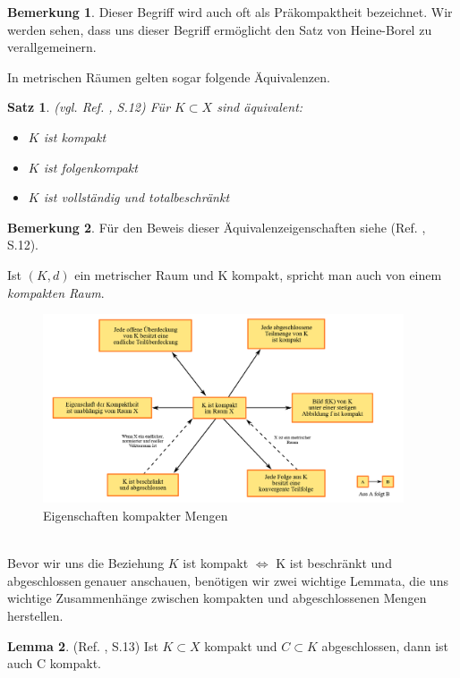 \documentclass[10pt,a4paper]{article}
\theoremstyle{plain}
\newtheorem{satz}{Satz}[section]
\newenvironment{sa}{\begin{shaded}\begin{satz}}{\end{satz}\end{shaded}}
\theoremstyle{definition}
\newtheorem{lemma}[satz]{Lemma}
\newenvironment{lem}{\begin{shaded}\begin{lemma}}{\end{lemma}\end{shaded}}
\theoremstyle{nonumberplain}
\newtheorem{bemerkung}{Bemerkung}
\newenvironment{bem}{\begin{bemerkung}}{\end{bemerkung}}
\begin{document}
\begin{bem}
Dieser Begriff wird auch oft als Präkompaktheit bezeichnet. Wir werden sehen, dass uns dieser Begriff ermöglicht den Satz von Heine-Borel zu verallgemeinern.
\end{bem}
In metrischen Räumen gelten sogar folgende Äquivalenzen.
\begin{sa}
\label{komp_eq}
(vgl. Ref. \cite{Clason}, S.12) Für $K \subset X$ sind äquivalent:
\begin{itemize}
\item[(i)] $K$ ist kompakt
\item[(ii)] $K$ ist folgenkompakt
\item[(iii)] $K$ ist vollständig und totalbeschränkt
\end{itemize}
\end{sa}
\begin{bem}
Für den Beweis dieser Äquivalenzeigenschaften siehe (Ref. \cite{Clason}, S.12).
\end{bem}
\noindent Ist $(K,d)$ ein metrischer Raum und K kompakt, spricht man auch von einem \textit{kompakten Raum}.
\begin{figure}[h]
\centering
\includegraphics[width=0.95\textwidth]{pictures/kompaktheit.png}
\caption{Eigenschaften kompakter Mengen \cite{KompakterRaum}}
\end{figure}
\quad\\
Bevor wir uns die Beziehung \glqq$K$ ist kompakt $\Leftrightarrow$ K ist beschränkt und abgeschlossen\grqq $\:$genauer anschauen, benötigen wir zwei wichtige Lemmata, die uns wichtige Zusammenhänge zwischen kompakten und abgeschlossenen Mengen herstellen.
\begin{lem}
\label{a}
(Ref. \cite{Clason}, S.13) Ist $K \subset X$ kompakt und $C \subset K$ abgeschlossen, dann ist auch C kompakt.
\end{lem}
\end{document}
